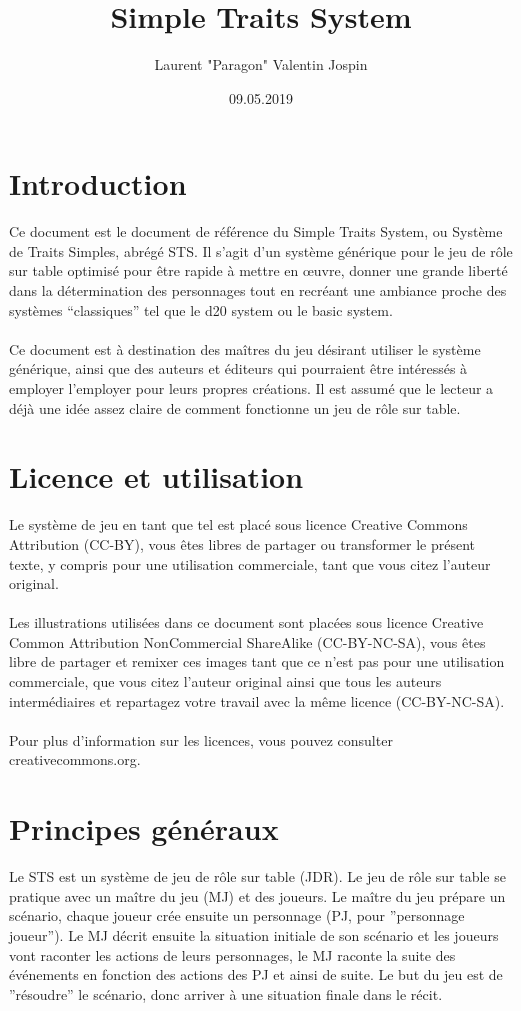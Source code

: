 \documentclass[a4paper,10pt,twoside,twocolumn]{article}
\author{Laurent "Paragon" Valentin Jospin}
\title{Simple Traits System}
\date{09.05.2019}
\begin{document}
  \maketitle
 
 \section{Introduction}
 
 Ce document est le document de référence du Simple Traits System, ou Système de Traits Simples, abrégé STS. Il s'agit d'un système générique pour le jeu de rôle sur table optimisé pour être rapide à mettre en œuvre, donner une grande liberté dans la détermination des personnages tout en recréant une ambiance proche des systèmes ``classiques'' tel que le d20 system ou le basic system.\\
 \\
 Ce document est à destination des maîtres du jeu désirant utiliser le système générique, ainsi que des auteurs et éditeurs qui pourraient être intéressés à employer l'employer pour leurs propres créations. Il est assumé que le lecteur a déjà une idée assez claire de comment fonctionne un jeu de rôle sur table.
 
 \section{Licence et utilisation}
 
 Le système de jeu en tant que tel est placé sous licence Creative Commons Attribution (CC-BY), vous êtes libres de partager ou transformer le présent texte, y compris pour une utilisation commerciale, tant que vous citez l'auteur original.\\
 \\
 Les illustrations utilisées dans ce document sont placées sous licence Creative Common Attribution NonCommercial ShareAlike (CC-BY-NC-SA), vous êtes libre de partager et remixer ces images tant que ce n'est pas pour une utilisation commerciale, que vous citez l'auteur original ainsi que tous les auteurs intermédiaires et repartagez votre travail avec la même licence (CC-BY-NC-SA).\\
 \\
 Pour plus d'information sur les licences, vous pouvez consulter creativecommons.org.
 
 \section{Principes généraux}
 \label{princip}
 Le STS est un système de jeu de rôle sur table (JDR). Le jeu de rôle sur table se pratique avec un maître du jeu (MJ) et des joueurs. Le maître du jeu prépare un scénario, chaque joueur crée ensuite un personnage (PJ, pour ''personnage joueur''). Le MJ décrit ensuite la situation initiale de son scénario et les joueurs vont raconter les actions de leurs personnages, le MJ raconte la suite des événements en fonction des actions des PJ et ainsi de suite. Le but du jeu est de ''résoudre'' le scénario, donc arriver à une situation finale dans le récit.
 
\end{document}
